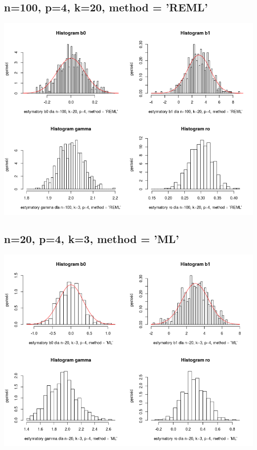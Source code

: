 \documentclass[a4paper,11pt]{article}
\begin{document}
\subsection{n=100, p=4,  k=20,  method = 'REML'}
\includegraphics[scale=.8]{Rplot5.png} 

\subsection{n=20, p=4,  k=3,  method = 'ML'}
\includegraphics[scale=.8]{Rplot62.png} 
\end{document}
